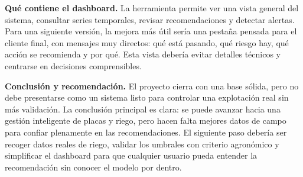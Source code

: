 \documentclass[11pt,a4paper]{article}
\begin{document}
\textbf{Qu\'e contiene el dashboard.} La herramienta permite ver una vista general del sistema, consultar series temporales, revisar recomendaciones y detectar alertas. Para una siguiente versi\'on, la mejora m\'as \'util ser\'ia una pesta\~na pensada para el cliente final, con mensajes muy directos: qu\'e est\'a pasando, qu\'e riesgo hay, qu\'e acci\'on se recomienda y por qu\'e. Esta vista deber\'ia evitar detalles t\'ecnicos y centrarse en decisiones comprensibles.

\textbf{Conclusi\'on y recomendaci\'on.} El proyecto cierra con una base s\'olida, pero no debe presentarse como un sistema listo para controlar una explotaci\'on real sin m\'as validaci\'on. La conclusi\'on principal es clara: se puede avanzar hacia una gesti\'on inteligente de placas y riego, pero hacen falta mejores datos de campo para confiar plenamente en las recomendaciones. El siguiente paso deber\'ia ser recoger datos reales de riego, validar los umbrales con criterio agron\'omico y simplificar el dashboard para que cualquier usuario pueda entender la recomendaci\'on sin conocer el modelo por dentro.
\end{document}
